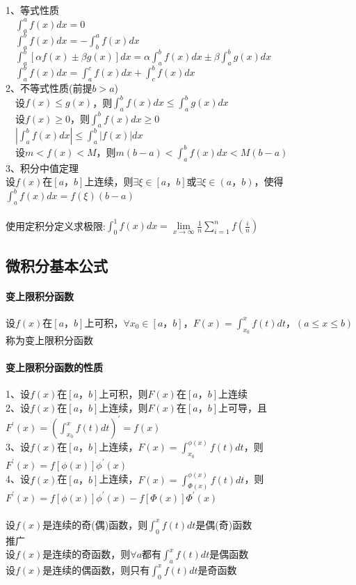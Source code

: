 \documentclass{article}
\begin{document}
\begin{flushleft}
	1、等式性质\\
	\ \ $\int_{a}^{a}f(x)dx=0$\\
	\ \ $\int_{a}^{b}f(x)dx=-\int_{b}^{a}f(x)dx$\\
	\ \ $\int_{a}^{b}[\alpha f(x)\pm \beta g(x)]dx=\alpha\int_{a}^{b}f(x)dx\pm \beta\int_{a}^{b}g(x)dx$\\
	\ \ $\int_{a}^{b}f(x)dx=\int_{a}^{c}f(x)dx+\int_{c}^{b}f(x)dx$\\
	2、不等式性质(前提$b>a$)\\
	\ \ 设$f(x)\le g(x)$，则$\int_{a}^{b}f(x)dx\le \int_{a}^{b}g(x)dx$\\
	\ \ 设$f(x)\ge 0$，则$\int_{a}^{b}f(x)dx \ge 0$\\
	\ \ $|\int_{a}^{b}f(x)dx| \le \int_{a}^{b}|f(x)|dx$\\
	\ \ 设$m<f(x)<M$，则$m(b-a)<\int_{a}^{b}f(x)dx<M(b-a)$\\
	3、积分中值定理\\
	设$f(x)$在$[a，b]$上连续，则$\exists \xi \in [a，b]$或$\exists \xi \in (a，b)$，使得$\int_{a}^{b}f(x)dx=f(\xi)(b-a)$\\
	~\\
	使用定积分定义求极限:$\int_{0}^{1}f(x)dx=\lim\limits_{x\to \infty}\frac{1}{n}\sum_{i=1}^{n}f(\frac{i}{n})$\\
	
	\subsection{微积分基本公式}
	
	\paragraph{变上限积分函数}
	设$f(x)$在$[a，b]$上可积，$\forall x_0\in [a，b]$，$F(x)=\int_{x_0}^{x}f(t)dt，(a\le x\le b)$称为变上限积分函数\\
	\paragraph{变上限积分函数的性质}
	1、设$f(x)$在$[a，b]$上可积，则$F(x)$在$[a，b]$上连续\\
	2、设$f(x)$在$[a，b]$上连续，则$F(x)$在$[a，b]$上可导，且$F^{'}(x)=(\int_{x_0}^{x}f(t)dt)^{'}=f(x)$\\
	3、设$f(x)$在$[a，b]$上连续，$F(x)=\int_{x_0}^{\phi(x)}f(t)dt$，则$F^{'}(x)=f[\phi(x)]\phi^{'}(x)$\\
	4、设$f(x)$在$[a，b]$上连续，$F(x)=\int_{\Phi(x)}^{\phi(x)}f(t)dt$，则$F^{'}(x)=f[\phi(x)]\phi^{'}(x)-f[\Phi(x)]\Phi^{'}(x)$\\
	~\\
	设$f(x)$是连续的奇(偶)函数，则$\int_{0}^{x}f(t)dt$是偶(奇)函数\\
	推广\\
	设$f(x)$是连续的奇函数，则$\forall a$都有$\int_{a}^{x}f(t)dt$是偶函数\\
	设$f(x)$是连续的偶函数，则只有$\int_{0}^{x}f(t)dt$是奇函数\\

\end{flushleft}
\end{document}

